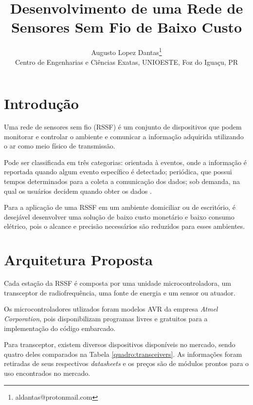 \documentclass[a4,11pt]{report}
\begin{document}
\title{Desenvolvimento de uma Rede de Sensores Sem Fio de Baixo Custo}

\author{
 {\large  Augusto Lopez Dantas}\thanks{aldantas@protonmail.com}\\
 {\small Centro de Engenharias e Ciências Exatas, UNIOESTE, Foz do Iguaçu, PR} \\
 }

\criartitulo

\section{Introdução}

Uma rede de sensores sem fio (RSSF) é um conjunto de dispositivos que podem monitorar e controlar o ambiente e
comunicar a informação adquirida utilizando o ar como meio físico de transmissão.

Pode ser classificada em três categorias: orientada à eventos, onde a informação é reportada quando algum
evento específico é detectado; periódica, que possui tempos determinados para a coleta a comunicação dos
dados; sob demanda, na qual os usuários decidem quando obter os dados \cite{liu_nayak_stojmenovic}.

Para a aplicação de uma RSSF em um ambiente domiciliar ou de escritório, é desejável desenvolver uma solução
de baixo custo monetário e baixo consumo elétrico, pois o alcance e precisão necessários são reduzidos para
esses ambientes.

\section{Arquitetura Proposta}
Cada estação da RSSF é composta por uma unidade microcontroladora, um transceptor de radiofrequência, uma
fonte de energia e um sensor ou atuador.

Os microcontroladores utlizados foram modelos AVR da empresa \textit{Atmel Corporation}, pois disponibilizam
programas livres e gratuitos para a implementação do código embarcado.

Para transceptor, existem diversos dispositivos disponíveis no mercado, sendo quatro deles comparados na
Tabela \ref{quadro:transceivers}. As informações foram retiradas de seus respectivos \textit{datasheets} e os
preços são de módulos prontos para o uso encontrados no mercado.
\end{document}
